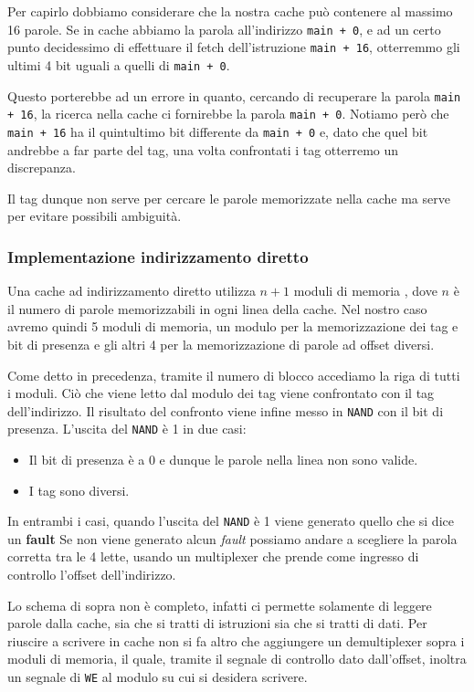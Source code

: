 Per capirlo dobbiamo considerare che la nostra cache può contenere al massimo 16 parole. Se in
cache abbiamo la parola all'indirizzo \verb|main + 0|, e ad un certo punto decidessimo di
effettuare il fetch dell'istruzione \verb|main + 16|, otterremmo gli ultimi 4 bit uguali a quelli
di \verb|main + 0|.

Questo porterebbe ad un errore in quanto, cercando di recuperare la parola \verb|main + 16|, la
ricerca nella cache ci fornirebbe la parola \verb|main + 0|. Notiamo però che \verb|main + 16| ha
il quintultimo bit differente da \verb|main + 0| e, dato che quel bit andrebbe a far parte del tag,
una volta confrontati i tag otterremo un discrepanza.

Il tag dunque non serve per cercare le parole memorizzate nella cache ma serve per evitare possibili
ambiguità.

\subsubsection{Implementazione indirizzamento diretto}
Una cache ad indirizzamento diretto utilizza $n+1$ moduli di memoria , dove $n$ è il numero di
parole memorizzabili in ogni linea della cache. Nel nostro caso avremo quindi 5 moduli di memoria,
un modulo per la memorizzazione dei tag e bit di presenza e gli altri 4 per la memorizzazione di
parole ad offset diversi.
\begin{center}
	
\end{center}
Come detto in precedenza, tramite il numero di blocco accediamo la riga di tutti i moduli. Ciò che
viene letto dal modulo dei tag viene confrontato con il tag dell'indirizzo. Il risultato del
confronto viene infine messo in \verb|NAND| con il bit di presenza. L'uscita del \verb|NAND| è 1
in due casi:
\begin{itemize}
	\item Il bit di presenza è a 0 e dunque le parole nella linea non sono valide.
	\item I tag sono diversi.
\end{itemize}
In entrambi i casi, quando l'uscita del \verb|NAND| è 1 viene generato quello che si dice un
\textbf{fault}
Se non viene generato alcun \emph{fault} possiamo andare a scegliere la parola corretta tra le 4
lette, usando un multiplexer che prende come ingresso di controllo l'offset dell'indirizzo.

Lo schema di sopra non è completo, infatti ci permette solamente di leggere parole dalla cache, sia
che si tratti di istruzioni sia che si tratti di dati. Per riuscire a scrivere in cache non si fa
altro che aggiungere un demultiplexer sopra i moduli di memoria, il quale, tramite il segnale di
controllo dato dall'offset, inoltra un segnale di \verb|WE| al modulo su cui si desidera scrivere.

